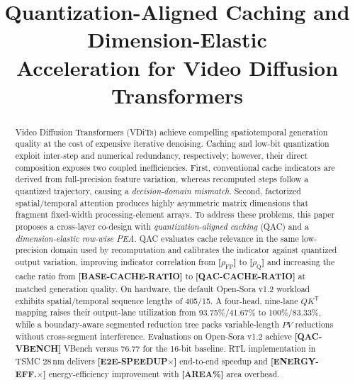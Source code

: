 \documentclass[conference]{IEEEtran}
\title{Quantization-Aligned Caching and Dimension-Elastic\\
Acceleration for Video Diffusion Transformers}
\newcommand{\ModelName}{Open-Sora v1.2}
\newcommand{\BaselineVBench}{76.77}
\newcommand{\QACVBench}{\textbf{[QAC-VBENCH]}}
\newcommand{\SpatialSeq}{405}
\newcommand{\TemporalSeq}{15}
\newcommand{\BaseSpatialQKUtil}{93.75\%}
\newcommand{\OursSpatialQKUtil}{100\%}
\newcommand{\BaseTemporalQKUtil}{41.67\%}
\newcommand{\OursTemporalQKUtil}{83.33\%}
\newcommand{\FPIndicatorCorr}{\textbf{[$\rho_{\mathrm{FP}}$]}}
\newcommand{\QIndicatorCorr}{\textbf{[$\rho_{\mathrm{Q}}$]}}
\newcommand{\BaseCacheRatio}{\textbf{[BASE-CACHE-RATIO]}}
\newcommand{\QACCacheRatio}{\textbf{[QAC-CACHE-RATIO]}}
\newcommand{\TechNode}{TSMC 28\,nm}
\newcommand{\AreaOverhead}{\textbf{[AREA\%]}}
\newcommand{\EtoESpeedup}{\textbf{[E2E-SPEEDUP$\times$]}}
\newcommand{\EnergyGain}{\textbf{[ENERGY-EFF.$\times$]}}
\begin{document}
\maketitle

\begin{abstract}
Video Diffusion Transformers (VDiTs) achieve compelling spatiotemporal
generation quality at the cost of expensive iterative denoising. Caching and
low-bit quantization exploit inter-step and numerical redundancy,
respectively; however, their direct composition exposes two coupled
inefficiencies. First, conventional cache indicators are derived from
full-precision feature variation, whereas recomputed steps follow a quantized
trajectory, causing a \emph{decision-domain mismatch}. Second, factorized
spatial/temporal attention produces highly asymmetric matrix dimensions that
fragment fixed-width processing-element arrays. To address these problems,
this paper proposes a cross-layer co-design with
\emph{quantization-aligned caching} (QAC) and a
\emph{dimension-elastic row-wise PEA}. QAC evaluates cache relevance in the
same low-precision domain used by recomputation and calibrates the indicator
against quantized output variation, improving indicator correlation from
\FPIndicatorCorr{} to \QIndicatorCorr{} and increasing the cache ratio from
\BaseCacheRatio{} to \QACCacheRatio{} at matched generation quality. On
hardware, the default \ModelName{} workload exhibits spatial/temporal
sequence lengths of \SpatialSeq{}/\TemporalSeq{}. A four-head,
nine-lane $QK^{\mathsf T}$ mapping raises their output-lane utilization from
\BaseSpatialQKUtil{}/\BaseTemporalQKUtil{} to
\OursSpatialQKUtil{}/\OursTemporalQKUtil{}, while a boundary-aware segmented
reduction tree packs variable-length $PV$ reductions without cross-segment
interference. Evaluations on \ModelName{} achieve \QACVBench{} VBench versus
\BaselineVBench{} for the 16-bit baseline. RTL implementation in \TechNode{}
delivers \EtoESpeedup{} end-to-end speedup and \EnergyGain{} energy-efficiency
improvement with \AreaOverhead{} area overhead.
\end{abstract}
\end{document}
